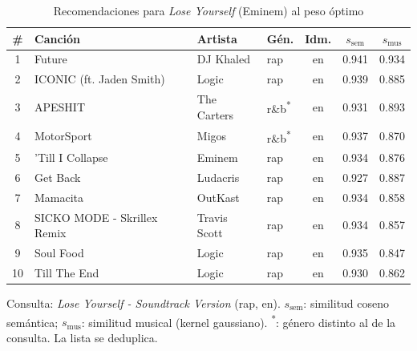 \begin{table}[htbp]
  \centering
  \begin{threeparttable}
  \caption{Recomendaciones para \emph{Lose Yourself} (Eminem) al peso óptimo}
  \label{tab:qual_case_lose_yourself}
  \small
  \begin{tabular}{clllccc}
    \toprule
    \# & Canción & Artista & Gén. & Idm. & $s_{\text{sem}}$ & $s_{\text{mus}}$ \\
    \midrule
    1 & Future & DJ Khaled & rap & en & 0.941 & 0.934 \\
    2 & ICONIC (ft. Jaden Smith) & Logic & rap & en & 0.939 & 0.885 \\
    3 & APESHIT & The Carters & r\&b\textsuperscript{*} & en & 0.931 & 0.893 \\
    4 & MotorSport & Migos & r\&b\textsuperscript{*} & en & 0.937 & 0.870 \\
    5 & 'Till I Collapse & Eminem & rap & en & 0.934 & 0.876 \\
    6 & Get Back & Ludacris & rap & en & 0.927 & 0.887 \\
    7 & Mamacita & OutKast & rap & en & 0.934 & 0.858 \\
    8 & SICKO MODE - Skrillex Remix & Travis Scott & rap & en & 0.934 & 0.857 \\
    9 & Soul Food & Logic & rap & en & 0.935 & 0.847 \\
    10 & Till The End & Logic & rap & en & 0.930 & 0.862 \\
    \bottomrule
  \end{tabular}
  \begin{tablenotes}[flushleft]
    \small
    \item Consulta: \emph{Lose Yourself - Soundtrack Version} (rap, en). $s_{\text{sem}}$: similitud coseno semántica; $s_{\text{mus}}$: similitud musical (kernel gaussiano). \textsuperscript{*}: género distinto al de la consulta. La lista se deduplica.
  \end{tablenotes}
  \end{threeparttable}
\end{table}